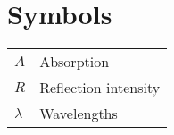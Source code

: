 \chapter*{\centering Symbols}
\begin{spacing}{1.5}
\setlength{\parskip}{0.3in}

\begin{table}[ht]
\centering
\begin{tabular}{ll}
\textbf{$A$} & Absorption \\
\textbf{$R$} & Reflection intensity \\
\textbf{$\lambda$} & Wavelengths \\

\end{tabular}
\end{table}
\end{spacing}
